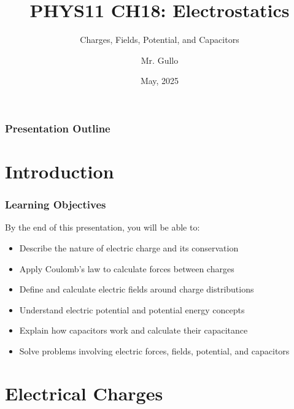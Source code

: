 \documentclass{beamer}
\title[Electric Forces \& Fields]{PHYS11 CH18: Electrostatics}
\subtitle{Charges, Fields, Potential, and Capacitors}
\author[Mr. Gullo]{Mr. Gullo}
\date[May 2025]{May, 2025}
\begin{document}
\begin{frame}
    \titlepage
\end{frame}

\begin{frame}
    \frametitle{Presentation Outline}
    \tableofcontents
\end{frame}

\section{Introduction}

\begin{frame}
    \frametitle{Learning Objectives}
    By the end of this presentation, you will be able to:
    \begin{itemize}
        \item Describe the nature of electric charge and its conservation
        \item Apply Coulomb's law to calculate forces between charges
        \item Define and calculate electric fields around charge distributions
        \item Understand electric potential and potential energy concepts
        \item Explain how capacitors work and calculate their capacitance
        \item Solve problems involving electric forces, fields, potential, and capacitors
    \end{itemize}
\end{frame}

\section{Electrical Charges}
\end{document}
